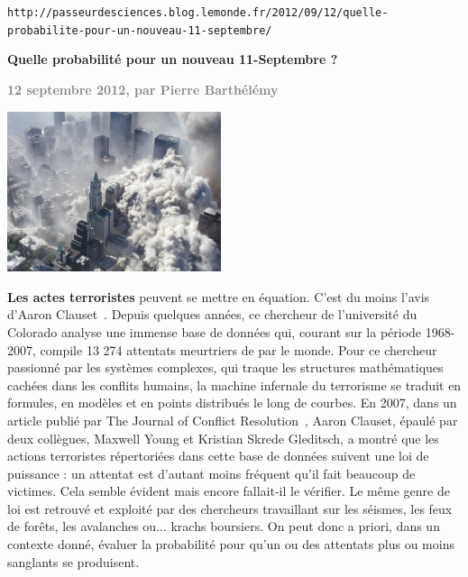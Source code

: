 \documentclass[11pt,twoside,a4paper]{article}
\begin{document}
\setlength\parindent{0pt} %

\texttt{http://passeurdesciences.blog.lemonde.fr/2012/09/12/quelle-probabilite-pour-un-nouveau-11-septembre/} %

\textbf{\LARGE Quelle probabilit{\'e} pour un nouveau 11-Septembre ?}%

\textcolor{gray}{ \textbf{\large 12 septembre 2012, par Pierre Barth{\'e}l{\'e}my} }

\begin{multicols}{2}
	\footnotesize

	\begin{center} \includegraphics[width=0.47\textwidth]{WTC.jpg} \end{center} 
	
	\textbf{Les actes terroristes} peuvent se mettre en {\'e}quation. C'est du moins l'avis d'Aaron Clauset~\footnotemark. Depuis quelques ann{\'e}es, ce chercheur de l'universit{\'e} du Colorado analyse une immense base de donn{\'e}es qui, courant sur la p{\'e}riode 1968-2007, compile 13 274 attentats meurtriers de par le monde. Pour ce chercheur passionn{\'e} par les syst{\`e}mes complexes, qui traque les structures math{\'e}matiques cach{\'e}es dans les conflits humains, la machine infernale du terrorisme se traduit en formules, en mod{\`e}les et en points distribu{\'e}s le long de courbes. En 2007, dans un article publi{\'e} par The Journal of Conflict Resolution~\footnotemark, Aaron Clauset, {\'e}paul{\'e} par deux coll{\`e}gues, Maxwell Young et Kristian Skrede Gleditsch, a montr{\'e} que les actions terroristes r{\'e}pertori{\'e}es dans cette base de donn{\'e}es suivent une loi de puissance : un attentat est d'autant moins fr{\'e}quent qu'il fait beaucoup de victimes. Cela semble {\'e}vident mais encore fallait-il le v{\'e}rifier. Le m{\^e}me genre de loi est retrouv{\'e} et exploit{\'e} par des chercheurs travaillant sur les s{\'e}ismes, les feux de for{\^e}ts, les avalanches ou... krachs boursiers. On peut donc a priori, dans un contexte donn{\'e}, {\'e}valuer la probabilit{\'e} pour qu'un ou des attentats plus ou moins sanglants se produisent. ~\\
	

\end{multicols}
\end{document}
